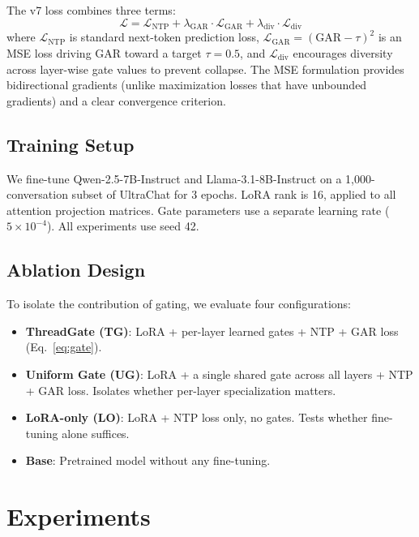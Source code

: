 \documentclass[11pt]{article}
\begin{document}
The v7 loss combines three terms:
\begin{equation}
    \mathcal{L} = \mathcal{L}_\text{NTP} + \lambda_\text{GAR} \cdot \mathcal{L}_\text{GAR} + \lambda_\text{div} \cdot \mathcal{L}_\text{div}
\end{equation}
where $\mathcal{L}_\text{NTP}$ is standard next-token prediction loss, $\mathcal{L}_\text{GAR} = (\text{GAR} - \tau)^2$ is an MSE loss driving GAR toward a target $\tau = 0.5$, and $\mathcal{L}_\text{div}$ encourages diversity across layer-wise gate values to prevent collapse. The MSE formulation provides bidirectional gradients (unlike maximization losses that have unbounded gradients) and a clear convergence criterion.

\subsection{Training Setup}

We fine-tune Qwen-2.5-7B-Instruct \citep{yang2024qwen2} and Llama-3.1-8B-Instruct \citep{dubey2024llama3} on a 1,000-conversation subset of UltraChat \citep{ding2023enhancing} for 3 epochs. LoRA rank is 16, applied to all attention projection matrices. Gate parameters use a separate learning rate ($5 \times 10^{-4}$). All experiments use seed 42.

\subsection{Ablation Design}
To isolate the contribution of gating, we evaluate four configurations:
\begin{itemize}
    \item \textbf{ThreadGate (TG)}: LoRA + per-layer learned gates + NTP + GAR loss (Eq.~\ref{eq:gate}).
    \item \textbf{Uniform Gate (UG)}: LoRA + a single shared gate across all layers + NTP + GAR loss. Isolates whether per-layer specialization matters.
    \item \textbf{LoRA-only (LO)}: LoRA + NTP loss only, no gates. Tests whether fine-tuning alone suffices.
    \item \textbf{Base}: Pretrained model without any fine-tuning.
\end{itemize}

\section{Experiments}
\label{sec:experiments}
\end{document}
